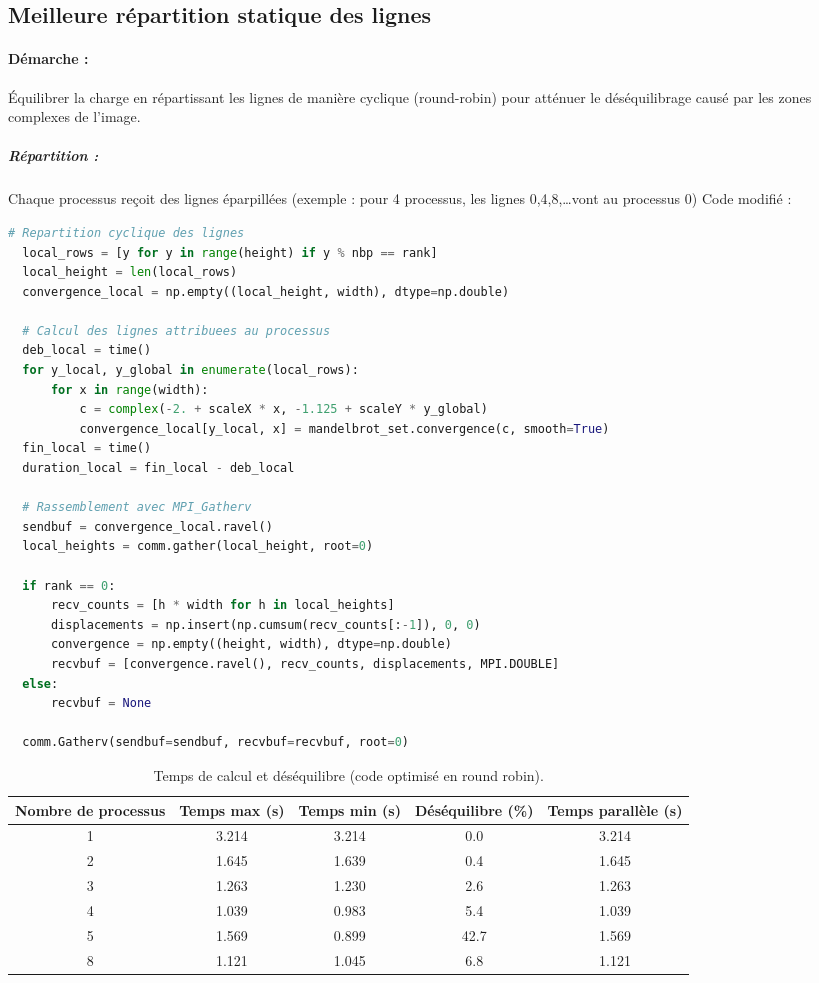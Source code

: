 \documentclass[a4paper,13pt]{book}
\begin{document}
\subsection{Meilleure répartition statique des lignes}
\paragraph{Démarche : }Équilibrer la charge en répartissant les lignes de manière cyclique (round-robin) pour atténuer le déséquilibrage causé par les zones complexes de l’image.
\subparagraph{Répartition : }Chaque processus reçoit des lignes éparpillées (exemple : pour 4 processus, les lignes 0,4,8,\dots vont au processus 0)
Code modifié :
\begin{lstlisting}[language=python]
  # Repartition cyclique des lignes
  local_rows = [y for y in range(height) if y % nbp == rank]
  local_height = len(local_rows)
  convergence_local = np.empty((local_height, width), dtype=np.double)
  
  # Calcul des lignes attribuees au processus
  deb_local = time()
  for y_local, y_global in enumerate(local_rows):
      for x in range(width):
          c = complex(-2. + scaleX * x, -1.125 + scaleY * y_global)
          convergence_local[y_local, x] = mandelbrot_set.convergence(c, smooth=True)
  fin_local = time()
  duration_local = fin_local - deb_local
  
  # Rassemblement avec MPI_Gatherv
  sendbuf = convergence_local.ravel()
  local_heights = comm.gather(local_height, root=0)
  
  if rank == 0:
      recv_counts = [h * width for h in local_heights]
      displacements = np.insert(np.cumsum(recv_counts[:-1]), 0, 0)
      convergence = np.empty((height, width), dtype=np.double)
      recvbuf = [convergence.ravel(), recv_counts, displacements, MPI.DOUBLE]
  else:
      recvbuf = None
  
  comm.Gatherv(sendbuf=sendbuf, recvbuf=recvbuf, root=0)
\end{lstlisting}
\begin{table}[ht]
  \centering
  \caption{Temps de calcul et déséquilibre (code optimisé en round robin).}
  \label{tab:temps_roundrobin}
  \begin{tabular}{@{}ccccc@{}}
    \toprule
    \textbf{Nombre de processus} & \textbf{Temps max (s)} & \textbf{Temps min (s)} & \textbf{Déséquilibre (\%)} & \textbf{Temps parallèle (s)} \\
    \midrule
    1 & 3.214 & 3.214 & 0.0  & 3.214 \\
    2 & 1.645 & 1.639 & 0.4  & 1.645 \\
    3 & 1.263 & 1.230 & 2.6  & 1.263 \\
    4 & 1.039 & 0.983 & 5.4  & 1.039 \\
    5 & 1.569 & 0.899 & 42.7 & 1.569 \\
    8 & 1.121 & 1.045 & 6.8  & 1.121 \\
    \bottomrule
  \end{tabular}
\end{table}
\end{document}
